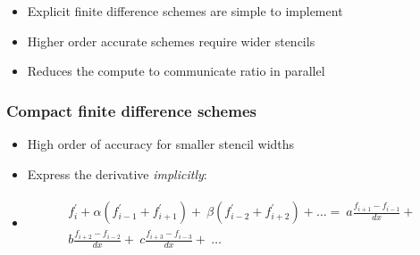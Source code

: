 \documentclass[10pt]{beamer}
\begin{document}
\begin{frame}
\begin{itemize}[<+->]
    \item Explicit finite difference schemes are simple to implement
    \item Higher order accurate schemes require wider stencils
    \item Reduces the compute to communicate ratio in parallel
\end{itemize}
\end{frame}

\begin{frame}
\frametitle{Compact finite difference schemes}
\begin{itemize}[<+->]
    \item High order of accuracy for smaller stencil widths
    \item Express the derivative \emph{implicitly}:
    \item [] \begin{align*}
        \begin{split}
            f_i^{\prime} + \alpha(f^{\prime}_{i-1} + f^{\prime}_{i+1}) + \
            \beta(f^{\prime}_{i-2} + f^{\prime}_{i+2}) + \hdots  = \
            a\frac{f_{i+1} - f_{i-1}}{dx} + \\
            b\frac{f_{i+2} - f_{i-2}}{dx} + \
            c\frac{f_{i+3} - f_{i-3}}{dx} + \
            \hdots
        \end{split}
        \end{align*}
\end{itemize}
\end{frame}
\end{document}
